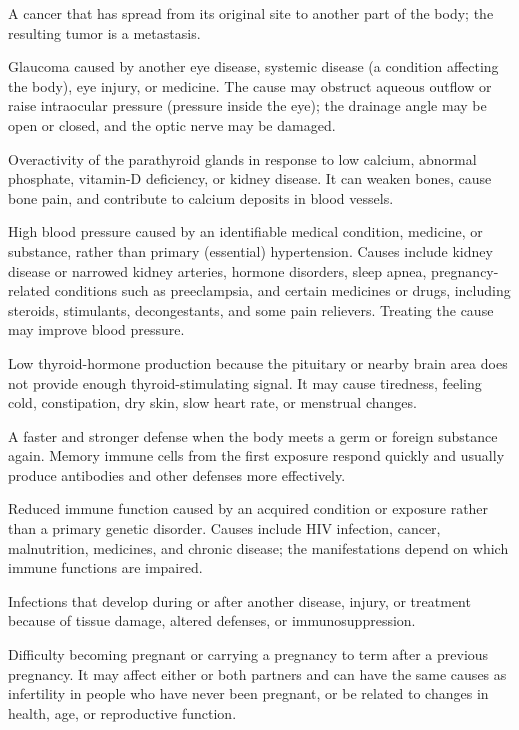  A cancer that has spread from its original site to another part of the body; the resulting tumor is a metastasis.

 Glaucoma caused by another eye disease, systemic disease (a condition affecting the body), eye injury, or medicine. The cause may obstruct aqueous outflow or raise intraocular pressure (pressure inside the eye); the drainage angle may be open or closed, and the optic nerve may be damaged.

 Overactivity of the parathyroid glands in response to low calcium, abnormal phosphate, vitamin-D deficiency, or kidney disease. It can weaken bones, cause bone pain, and contribute to calcium deposits in blood vessels.

 High blood pressure caused by an identifiable medical condition, medicine, or substance, rather than primary (essential) hypertension. Causes include kidney disease or narrowed kidney arteries, hormone disorders, sleep apnea, pregnancy-related conditions such as preeclampsia, and certain medicines or drugs, including steroids, stimulants, decongestants, and some pain relievers. Treating the cause may improve blood pressure.

 Low thyroid-hormone production because the pituitary or nearby brain area does not provide enough thyroid-stimulating signal. It may cause tiredness, feeling cold, constipation, dry skin, slow heart rate, or menstrual changes.

 A faster and stronger defense when the body meets a germ or foreign substance again. Memory immune cells from the first exposure respond quickly and usually produce antibodies and other defenses more effectively.

 Reduced immune function caused by an acquired condition or exposure rather than a primary genetic disorder. Causes
include HIV infection, cancer, malnutrition, medicines, and chronic disease; the
manifestations depend on which immune functions are impaired.

 Infections that develop during or after another disease, injury, or treatment because of tissue damage, altered defenses, or immunosuppression.

 Difficulty becoming pregnant or carrying a pregnancy to term after a previous pregnancy. It may affect either or both partners and can have the same causes as infertility in people who have never been pregnant, or be related to changes in health, age, or reproductive function.

